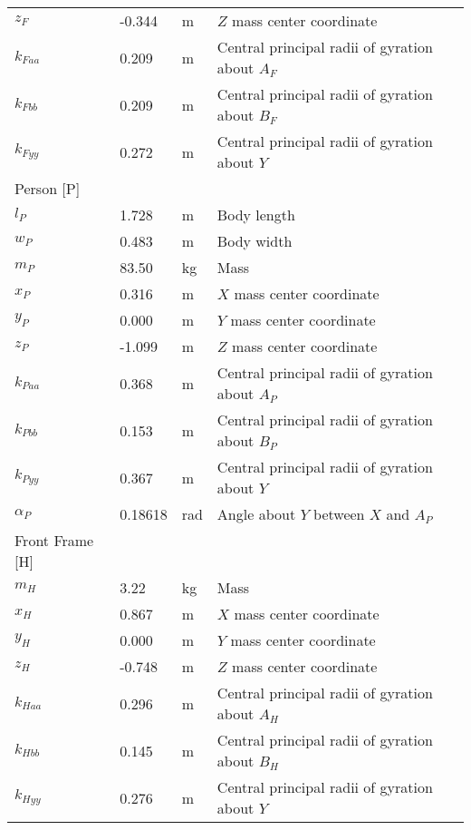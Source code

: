 \documentclass{bmd2019p}
\begin{document}
\begin{table}
\begin{tabular}{llll}
    $z_F$     & -0.344 & \si{\meter} & $Z$ mass center coordinate \\
    $k_{Faa}$ &  0.209 & \si{\meter} & Central principal radii of gyration about $A_F$ \\
    $k_{Fbb}$ &  0.209 & \si{\meter} & Central principal radii of gyration about $B_F$ \\
    $k_{Fyy}$ &  0.272 & \si{\meter} & Central principal radii of gyration about $Y$ \\
    Person [P] & & \\
    \midrule
    $l_P$      &  1.728   & \si{\meter} & Body length \\
    $w_P$      &  0.483   & \si{\meter} & Body width \\
    $m_P$      &  83.50    & \si{\kilogram} & Mass \\
    $x_P$      &  0.316 & \si{\meter} & $X$ mass center coordinate \\
    $y_P$      & 0.000      & \si{\meter} & $Y$ mass center coordinate \\
    $z_P$      & -1.099  & \si{\meter} & $Z$ mass center coordinate \\
    $k_{Paa}$  &  0.368 & \si{\meter} & Central principal radii of gyration about $A_P$ \\
    $k_{Pbb}$  &  0.153 & \si{\meter} & Central principal radii of gyration about $B_P$ \\
    $k_{Pyy}$  &  0.367 & \si{\meter} & Central principal radii of gyration about $Y$ \\
    $\alpha_P$ & 0.18618 & \si{\radian} & Angle about $Y$ between $X$ and $A_P$ \\
    Front Frame [H] & & \\
    \midrule
    $m_H$ & 3.22 & \si{\kilogram}     & Mass \\
    $x_H$ & 0.867 & \si{\meter}       & $X$ mass center coordinate \\
    $y_H$ & 0.000 & \si{\meter}           & $Y$ mass center coordinate \\
    $z_H$ & -0.748 & \si{\meter}      & $Z$ mass center coordinate \\
    $k_{Haa}$ & 0.296 & \si{\meter}   & Central principal radii of gyration about $A_H$ \\
    $k_{Hbb}$ & 0.145 & \si{\meter}   & Central principal radii of gyration about $B_H$ \\
    $k_{Hyy}$ & 0.276 & \si{\meter}   & Central principal radii of gyration about $Y$ \\

\end{tabular}
\end{table}
\end{document}
